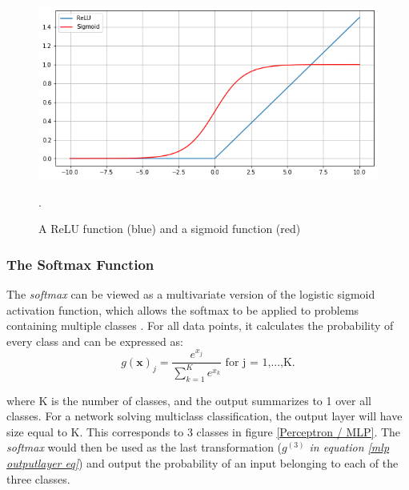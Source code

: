             \begin{figure}[H]
                \centering
                \includegraphics[scale=0.5]{figures/activation.png}
                \caption[ReLu and sigmoid]{A ReLU function (blue) and a sigmoid function (red)}.
              	\medskip 
                \label{activation_fig}
            \end{figure}

    \subsubsection{The Softmax Function}
        The \textit{softmax} can be viewed as a multivariate version of the logistic sigmoid activation function, which allows the softmax to be applied to problems containing multiple classes \cite{sharma2019new_activation_func}. For all data points, it calculates the probability of every class and can be expressed as:
        \begin{equation}
            g(\textbf{x})_{j} = \dfrac{e^{x_{j}}}{\sum^{K}_{k=1}e^{x_{k}}} \textrm{ for j = 1,...,K.}
        \end{equation}
        
        where K is the number of classes, and the output summarizes to 1 over all classes. For a network solving multiclass classification, the output layer will have size equal to K. This corresponds to 3 classes in figure \ref{Perceptron / MLP}. The \textit{softmax} would then be used as the last transformation (\textit{$g^{(3)}$ in equation \ref{mlp outputlayer eq}}) and output the probability of an input belonging to each of the three classes.
        
